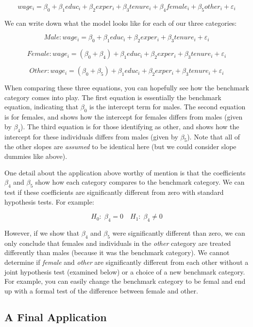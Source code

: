 \documentclass[
]{book}
\begin{document}
\[wage_i=\beta_0+\beta_1educ_i+\beta_2exper_i+\beta_3tenure_i+\beta_4female_i +\beta_5other_i +\varepsilon_i\]

We can write down what the model looks like for each of our three categories:

\[Male: wage_i=\beta_0+\beta_1educ_i+\beta_2exper_i+\beta_3tenure_i+\varepsilon_i\]

\[Female: wage_i=(\beta_0+\beta_4)+\beta_1educ_i+\beta_2exper_i+\beta_3tenure_i+\varepsilon_i\]

\[Other: wage_i=(\beta_0+\beta_5)+\beta_1educ_i+\beta_2exper_i+\beta_3tenure_i+\varepsilon_i\]

When comparing these three equations, you can hopefully see how the benchmark category comes into play. The first equation is essentially the benchmark equation, indicating that \(\beta_0\) is the intercept term for males. The second equation is for females, and shows how the intercept for females differs from males (given by \(\beta_4\)). The third equation is for those identifying as other, and shows how the intercept for these individuals differs from males (given by \(\beta_5\)). Note that all of the other slopes are \emph{assumed} to be identical here (but we could consider slope dummies like above).

One detail about the application above worthy of mention is that the coefficients \(\beta_4\) and \(\beta_5\) show how each category compares to the benchmark category. We can test if these coefficients are significantly different from zero with standard hypothesis tests. For example:

\[H_0: \; \beta_4 = 0 \quad H_1: \; \beta_4 \neq 0\]

However, if we show that \(\beta_4\) and \(\beta_5\) were significantly different than zero, we can only conclude that females and individuals in the \emph{other} category are treated differently than males (because it was the benchmark category). We cannot determine if \emph{female} and \emph{other} are significantly different from each other without a joint hypothesis test (examined below) or a choice of a new benchmark category. For example, you can easily change the benchmark category to be femal and end up with a formal test of the difference between female and other.

\hypertarget{a-final-application}{%
\subsection{A Final Application}\label{a-final-application}}
\end{document}
